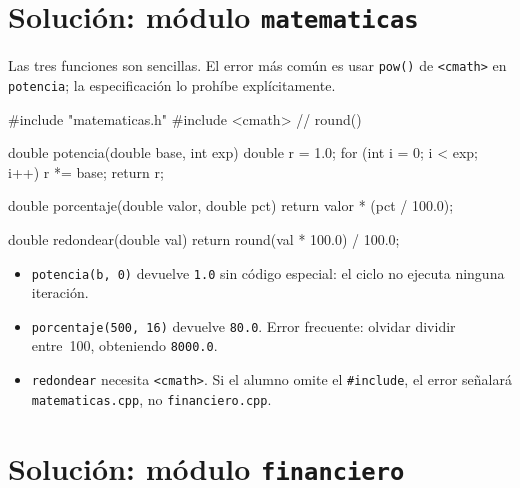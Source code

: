 \documentclass[12pt, oneside]{article}
\begin{document}
\section{Solución: módulo \texttt{matematicas}}

\begin{notaprofesor}
  Las tres funciones son sencillas.  El error más común es usar
  \texttt{pow()} de \texttt{<cmath>} en \texttt{potencia}; la
  especificación lo prohíbe explícitamente.

\begin{codigo}
#include "matematicas.h"
#include <cmath>    // round()

double potencia(double base, int exp) {
    double r = 1.0;
    for (int i = 0; i < exp; i++)
        r *= base;
    return r;
}

double porcentaje(double valor, double pct) {
    return valor * (pct / 100.0);
}

double redondear(double val) {
    return round(val * 100.0) / 100.0;
}
\end{codigo}

  \begin{itemize}
    \item \texttt{potencia(b,~0)} devuelve \texttt{1.0} sin código especial:
          el ciclo no ejecuta ninguna iteración.
    \item \texttt{porcentaje(500,~16)} devuelve \texttt{80.0}.
          Error frecuente: olvidar dividir entre~100, obteniendo \texttt{8000.0}.
    \item \texttt{redondear} necesita \texttt{<cmath>}.  Si el alumno
          omite el \texttt{\#include}, el error señalará \texttt{matematicas.cpp},
          no \texttt{financiero.cpp}.
  \end{itemize}
\end{notaprofesor}

\section{Solución: módulo \texttt{financiero}}
\end{document}
